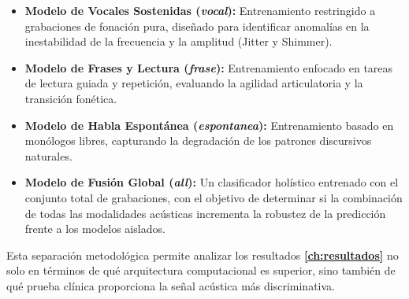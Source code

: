 \begin{itemize}
    \item \textbf{Modelo de Vocales Sostenidas (\textit{vocal}):} Entrenamiento restringido a grabaciones de fonación pura, diseñado para identificar anomalías en la inestabilidad de la frecuencia y la amplitud (Jitter y Shimmer).
    \item \textbf{Modelo de Frases y Lectura (\textit{frase}):} Entrenamiento enfocado en tareas de lectura guiada y repetición, evaluando la agilidad articulatoria y la transición fonética.
    \item \textbf{Modelo de Habla Espontánea (\textit{espontanea}):} Entrenamiento basado en monólogos libres, capturando la degradación de los patrones discursivos naturales.
    \item \textbf{Modelo de Fusión Global (\textit{all}):} Un clasificador holístico entrenado con el conjunto total de grabaciones, con el objetivo de determinar si la combinación de todas las modalidades acústicas incrementa la robustez de la predicción frente a los modelos aislados.
\end{itemize}

Esta separación metodológica permite analizar los resultados \textbf{\autoref{ch:resultados}} no solo en términos de qué arquitectura computacional es superior, sino también de qué prueba clínica proporciona la señal acústica más discriminativa.